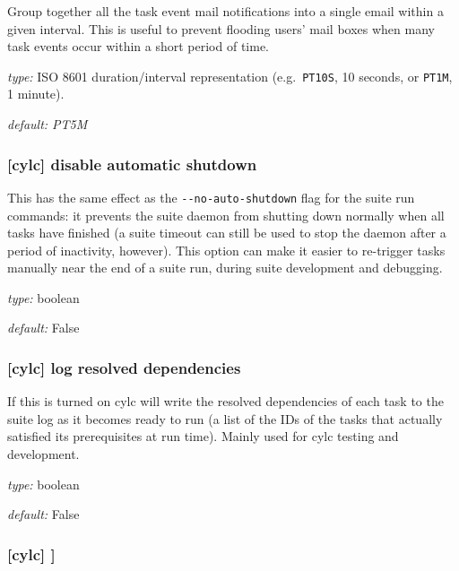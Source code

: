 Group together all the task event mail notifications into a single email within
a given interval. This is useful to prevent flooding users' mail boxes when
many task events occur within a short period of time.

\begin{myitemize}
  \item {\em type:} ISO 8601 duration/interval representation (e.g.\ \lstinline=PT10S=, 10 seconds, or \lstinline=PT1M=, 1 minute).
  \item {\em default: PT5M}
\end{myitemize}

\subsubsection[disable automatic shutdown]{[cylc] \textrightarrow disable automatic shutdown}

This has the same effect as the \lstinline{--no-auto-shutdown} flag for
the suite run commands: it prevents the suite daemon from shutting down
normally when all tasks have finished (a suite timeout can still be used to
stop the daemon after a period of inactivity, however).  This option can
make it easier to re-trigger tasks manually near the end of a suite run,
during suite development and debugging.

\begin{myitemize}
    \item {\em type:} boolean
    \item {\em default:} False
\end{myitemize}

\subsubsection[log resolved dependencies]{[cylc] \textrightarrow log resolved dependencies}

If this is turned on cylc will write the resolved dependencies of each
task to the suite log as it becomes ready to run (a list of the IDs of
the tasks that actually satisfied its prerequisites at run time). Mainly
used for cylc testing and development.

\begin{myitemize}
    \item {\em type:} boolean
    \item {\em default:} False
\end{myitemize}

\subsubsection[{[[}parameters{]]}]{[cylc] \textrightarrow [[parameters]]}

